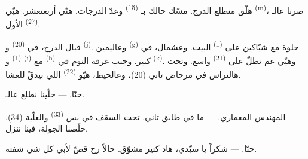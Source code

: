 هلّق منطلع الدرج. مسّك حالك بـ \textsuperscript{(15)}
وعدّ الدرجات. هنّي أربعتعشر. هيّي  \textsuperscript{(m)}،
صرنا عالـ \textsuperscript{(27)} الأول.

\VUsaut{3.0mm}
\VUsaut{3.0mm}

قبال الدرج، في  \textsuperscript{(20)} و \textsuperscript{(j)}. وعاليمين 
\textsuperscript{(g)} حلوة مع شبّاكين على 
\textsuperscript{(1)} البيت. وعشمال، في 
\textsuperscript{(1)} و \textsuperscript{(i)} مع
 \textsuperscript{(h)} كبير. وجنب غرفة النوم في  \textsuperscript{(k)}. وهيّي عم تطلّ على 
\textsuperscript{(21)} واسع. وتحت هالتراس في مرحاض تاني (20)، وعالحيط،
هيّو  \textsuperscript{(22)} اللي بيدقّ للعشا.

\textsc{حنّا}. --- خلّينا نطلع عالـ.

\textsc{المهندس المعماري}. --- ما في طابق تاني. تحت السقف في بس
 \textsuperscript{(33)} والعلّية (34). خلّصنا الجولة،
فينا ننزل.

\textsc{حنّا}. --- شكراً يا سيّدي، هاد كتير مشوّق. حالاً رح قصّ لأبي كل
شي شفته.

\VUsaut{4.0mm}
\VUfilet{22mm}
